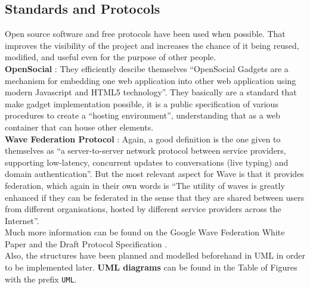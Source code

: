 \subsection{Standards and Protocols}
Open source software and free protocols have been used when possible. That improves the visibility of the project and increases the chance of it being reused, modified, and useful even for the purpose of other people.\\[.2cm]
\textbf{OpenSocial} \cite{ref:opensocial}: They efficiently descibe themselves ``OpenSocial Gadgets are a mechanism for embedding one web application into other web application using modern Javascript and HTML5 technology''. They basically are a standard that make gadget implementation possible, it is a public specification of various procedures to create a ``hosting environment'', understanding that as a web container that can house other elements.\\[.2cm]
\textbf{Wave Federation Protocol} \cite{ref:wave_federation_protocol}: Again, a good definition is the one given to themselves as ``a server-to-server network protocol between service providers, supporting low-latency, concurrent updates to conversations (live typing) and domain authentication''. But the most relevant aspect for Wave is that it provides federation, which again in their own words is ``The utility of waves is greatly enhanced if they can be federated in the sense that they are shared between users from different organisations, hosted by different service providers across the Internet''.\\[.2cm]
Much more information can be found on the Google Wave Federation White Paper \cite{ref:wave_white_paper} and the Draft Protocol Specification \cite{ref:wave_over_xmpp}.\\[.2cm]
Also, the structures have been planned and modelled beforehand in UML \cite{ref:uml} in order to be implemented later. \textbf{UML diagrams} can be found in the Table of Figures with the prefix \verb|UML|.
